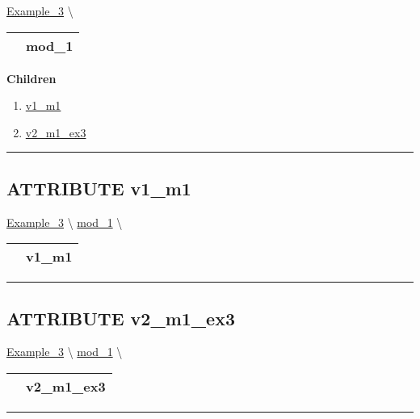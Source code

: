 \hypertarget{ecldoc:intest.inintest.Example_3.mod_1}{}
\hspace{0pt} \hyperlink{ecldoc:intest.inintest.Example_3}{Example_3} \textbackslash 

{\renewcommand{\arraystretch}{1.5}
\begin{tabularx}{\textwidth}{|>{\raggedright\arraybackslash}l|X|}
\hline
\hspace{0pt}\mytexttt{\color{red} } & \textbf{mod\_1} \\
\hline
\end{tabularx}
}

\par


\textbf{Children}
\begin{enumerate}
\item \hyperlink{ecldoc:intest.inintest.example_3.mod_1.v1_m1}{v1\_m1}
\item \hyperlink{ecldoc:intest.inintest.example_3.mod_1.v2_m1_ex3}{v2\_m1\_ex3}
\end{enumerate}

\rule{\linewidth}{0.5pt}

\subsection*{\textsf{\colorbox{headtoc}{\color{white} ATTRIBUTE}
v1\_m1}}

\hypertarget{ecldoc:intest.inintest.example_3.mod_1.v1_m1}{}
\hspace{0pt} \hyperlink{ecldoc:intest.inintest.Example_3}{Example_3} \textbackslash 
\hspace{0pt} \hyperlink{ecldoc:intest.inintest.Example_3.mod_1}{mod_1} \textbackslash 

{\renewcommand{\arraystretch}{1.5}
\begin{tabularx}{\textwidth}{|>{\raggedright\arraybackslash}l|X|}
\hline
\hspace{0pt}\mytexttt{\color{red} } & \textbf{v1\_m1} \\
\hline
\end{tabularx}
}

\par


\rule{\linewidth}{0.5pt}
\subsection*{\textsf{\colorbox{headtoc}{\color{white} ATTRIBUTE}
v2\_m1\_ex3}}

\hypertarget{ecldoc:intest.inintest.example_3.mod_1.v2_m1_ex3}{}
\hspace{0pt} \hyperlink{ecldoc:intest.inintest.Example_3}{Example_3} \textbackslash 
\hspace{0pt} \hyperlink{ecldoc:intest.inintest.Example_3.mod_1}{mod_1} \textbackslash 

{\renewcommand{\arraystretch}{1.5}
\begin{tabularx}{\textwidth}{|>{\raggedright\arraybackslash}l|X|}
\hline
\hspace{0pt}\mytexttt{\color{red} } & \textbf{v2\_m1\_ex3} \\
\hline
\end{tabularx}
}

\par


\rule{\linewidth}{0.5pt}




